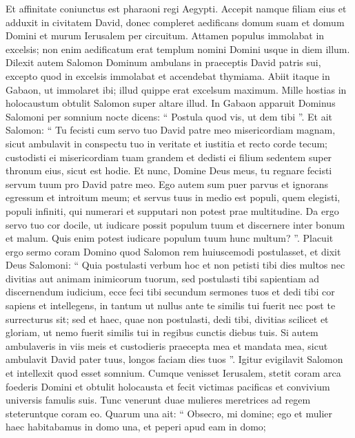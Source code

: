 \begin{biblechapter}
\begin{biblechapter}
\begin{biblechapter}
\verse Et affinitate coniunctus est pharaoni regi Aegypti. Accepit namque filiam eius et adduxit in civitatem David, donec compleret aedificans domum suam et domum Domini et murum Ierusalem per circuitum.
 \verse Attamen populus immolabat in excelsis; non enim aedificatum erat templum nomini Domini usque in diem illum. 
\verse Dilexit autem Salomon Dominum ambulans in praeceptis David patris sui, excepto quod in excelsis immolabat et accendebat thymiama. 
\verse Abiit itaque in Gabaon, ut immolaret ibi; illud quippe erat excelsum maximum. Mille hostias in holocaustum obtulit Salomon super altare illud.
 \verse In Gabaon apparuit Dominus Salomoni per somnium nocte dicens: “ Postula quod vis, ut dem tibi ”. 
\verse Et ait Salomon: “ Tu fecisti cum servo tuo David patre meo misericordiam magnam, sicut ambulavit in conspectu tuo in veritate et iustitia et recto corde tecum; custodisti ei misericordiam tuam grandem et dedisti ei filium sedentem super thronum eius, sicut est hodie. 
\verse Et nunc, Domine Deus meus, tu regnare fecisti servum tuum pro David patre meo. Ego autem sum puer parvus et ignorans egressum et introitum meum; 
\verse et servus tuus in medio est populi, quem elegisti, populi infiniti, qui numerari et supputari non potest prae multitudine. 
\verse Da ergo servo tuo cor docile, ut iudicare possit populum tuum et discernere inter bonum et malum. Quis enim potest iudicare populum tuum hunc multum? ”.
 \verse Placuit ergo sermo coram Domino quod Salomon rem huiuscemodi postulasset, 
 \verse et dixit Deus Salomoni: “ Quia postulasti verbum hoc et non petisti tibi dies multos nec divitias aut animam inimicorum tuorum, sed postulasti tibi sapientiam ad discernendum iudicium, 
\verse ecce feci tibi secundum sermones tuos et dedi tibi cor sapiens et intellegens, in tantum ut nullus ante te similis tui fuerit nec post te surrecturus sit; 
\verse sed et haec, quae non postulasti, dedi tibi, divitias scilicet et gloriam, ut nemo fuerit similis tui in regibus cunctis diebus tuis. 
\verse Si autem ambulaveris in viis meis et custodieris praecepta mea et mandata mea, sicut ambulavit David pater tuus, longos faciam dies tuos ”. 
\verse Igitur evigilavit Salomon et intellexit quod esset somnium. Cumque venisset Ierusalem, stetit coram arca foederis Domini et obtulit holocausta et fecit victimas pacificas et convivium universis famulis suis.
 \verse Tunc venerunt duae mulieres meretrices ad regem steteruntque coram eo. 
\verse Quarum una ait: “ Obsecro, mi domine; ego et mulier haec habitabamus in domo una, et peperi apud eam in domo; 

\end{biblechapter}
\end{biblechapter}
\end{biblechapter}
